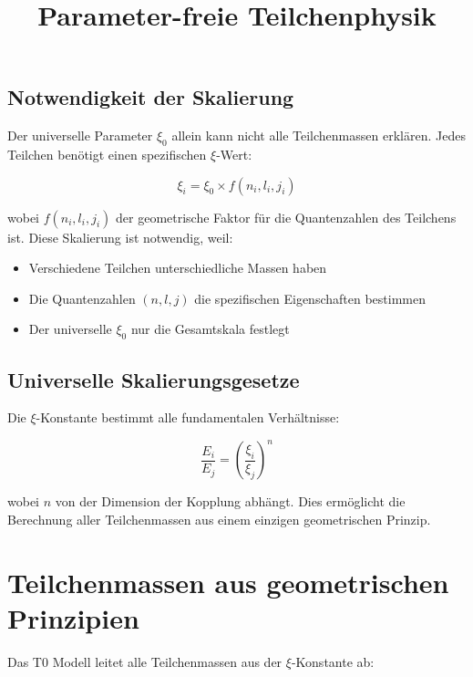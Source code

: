 \documentclass[12pt,a4paper]{report}
\begin{document}
\subsection{Notwendigkeit der Skalierung}

Der universelle Parameter $\xi_0$ allein kann nicht alle Teilchenmassen erklären. Jedes Teilchen benötigt einen spezifischen $\xi$-Wert:

\begin{equation}
	\xi_i = \xi_0 \times f(n_i, l_i, j_i)
\end{equation}

wobei $f(n_i, l_i, j_i)$ der geometrische Faktor für die Quantenzahlen des Teilchens ist. Diese Skalierung ist notwendig, weil:

\begin{itemize}
	\item Verschiedene Teilchen unterschiedliche Massen haben
	\item Die Quantenzahlen $(n, l, j)$ die spezifischen Eigenschaften bestimmen
	\item Der universelle $\xi_0$ nur die Gesamtskala festlegt
\end{itemize}

\subsection{Universelle Skalierungsgesetze}

Die $\xi$-Konstante bestimmt alle fundamentalen Verhältnisse:

\begin{equation}
	\frac{E_i}{E_j} = \left(\frac{\xi_i}{\xi_j}\right)^n
\end{equation}

wobei $n$ von der Dimension der Kopplung abhängt. Dies ermöglicht die Berechnung aller Teilchenmassen aus einem einzigen geometrischen Prinzip.

	\title{Parameter-freie Teilchenphysik}
\maketitle
	
	\section{Teilchenmassen aus geometrischen Prinzipien}
	
	Das T0 Modell leitet alle Teilchenmassen aus der $\xi$-Konstante ab:
	
\end{document}
